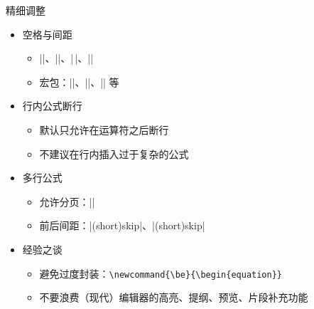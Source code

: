 \begin{frame}[fragile]{精细调整}
\begin{itemize}
  \item 空格与间距
    \begin{itemize}
      \item |\quad|、|\qquad|、|\,|、|\!|
      \item {} 宏包：||、|\qcomma|、|\qif| 等
    \end{itemize}

  \item 行内公式断行
    \begin{itemize}
      \item 默认只允许在运算符之后断行
      \item 不建议在行内插入过于复杂的公式
    \end{itemize}

  \item 多行公式
    \begin{itemize}
      \item 允许分页：|\allowdisplaybreaks|
      \item 前后间距：|\abovedisplay(short)skip|、|\belowdisplay(short)skip|
    \end{itemize} \pause

  \item 经验之谈
    \begin{itemize}
      \item 避免过度封装：\lstinline[style=styleinline]|\newcommand{\be}{\begin{equation}}|
      \item 不要浪费（现代）编辑器的高亮、提纲、预览、片段补充功能
    \end{itemize}
\end{itemize}
\end{frame}

